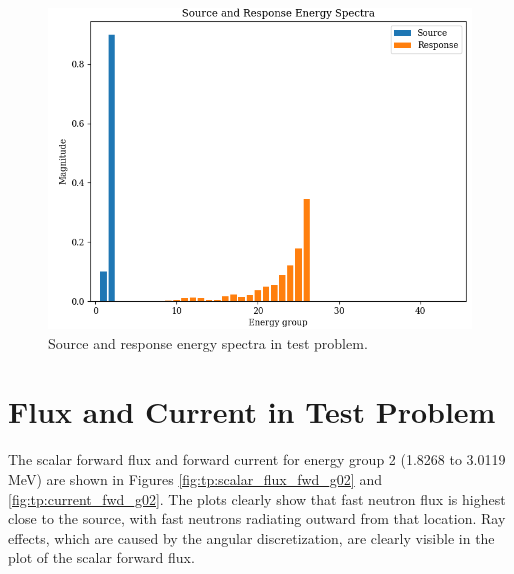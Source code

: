 \begin{figure}
  \centering
  \includegraphics[width=0.5\linewidth]{content/testprob/spectra_lin.png}
  \caption{Source and response energy spectra in test problem.}
  \label{fig:tp:spectra_lin}
\end{figure}

\section{Flux and Current in Test Problem}
\label{sec:bg:tp:flux}


The scalar forward flux and forward current for energy group 2 (1.8268 to 3.0119 MeV) are shown in Figures \ref{fig:tp:scalar_flux_fwd_g02} and \ref{fig:tp:current_fwd_g02}.
The plots clearly show that fast neutron flux is highest close to the source, with fast neutrons radiating outward from that location.
Ray effects, which are caused by the angular discretization, are clearly visible in the plot of the scalar forward flux.

